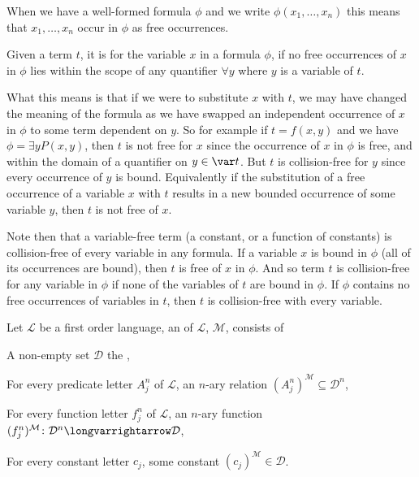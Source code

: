 \documentclass[10pt]{article}
\let\longto=\longvarrightarrow
\def\mL{\mathcal{L}}
\def\mM{\mathcal{M}}
\def\mD{\mathcal{D}}
\begin{document}


\bigskip

When we have a well-formed formula $\phi$ and we write $\phi(x_1,\dots,x_n)$ this means that $x_1,\dots,x_n$ occur in $\phi$ as free occurrences.

\begin{defn*}

    Given a term $t$, it is  for the variable $x$ in a formula $\phi$, if no free occurrences of $x$ in $\phi$ lies within the scope of any quantifier $\forall y$ where $y$ is a
    variable of $t$.

\end{defn*}

What this means is that if we were to substitute $x$ with $t$, we may have changed the meaning of the formula as we have swapped an independent occurrence of $x$ in $\phi$ to some term dependent on $y$.
So for example if $t=f(x,y)$ and we have $\phi=\exists y P(x,y)$, then $t$ is not free for $x$ since the occurrence of $x$ in $\phi$ is free, and within the domain of a quantifier on $y\in\var t$.
But $t$ is collision-free for $y$ since every occurrence of $y$ is bound.
Equivalently if the substitution of a free occurrence of a variable $x$ with $t$ results in a new bounded occurrence of some variable $y$, then $t$ is not free of $x$.

Note then that a variable-free term (a constant, or a function of constants) is collision-free of every variable in any formula.
If a variable $x$ is bound in $\phi$ (all of its occurrences are bound), then $t$ is free of $x$ in $\phi$.
And so term $t$ is collision-free for any variable in $\phi$ if none of the variables of $t$ are bound in $\phi$.
If $\phi$ contains no free occurrences of variables in $t$, then $t$ is collision-free with every variable.

\begin{defn*}

    Let $\mL$ be a first order language, an  of $\mL$, $\mM$, consists of
    \blist
        \item A non-empty set $\mD$ the , 
        \item For every predicate letter $A_j^n$ of $\mL$, an $n$-ary relation $(A_j^n)^{\mM}\subseteq\mD^n$,
        \item For every function letter $f_j^n$ of $\mL$, an $n$-ary function $(f_j^n)^{\mM}\colon\mD^n\longto\mD$,
        \item For every constant letter $c_j$, some constant $(c_j)^{\mM}\in\mD$.
    \elist

\end{defn*}
\end{document}
